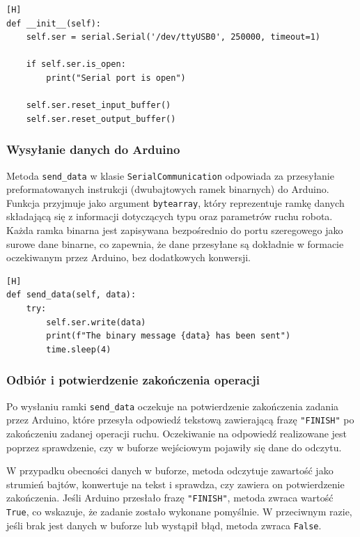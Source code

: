 \vspace*{0.5cm}


\begin{lstlisting}[caption=Kod inicjalizujący połączenie szeregowe, label=fig:serial_init, captionpos=b][H]
def __init__(self):
    self.ser = serial.Serial('/dev/ttyUSB0', 250000, timeout=1)

    if self.ser.is_open:
        print("Serial port is open")

    self.ser.reset_input_buffer()
    self.ser.reset_output_buffer()
\end{lstlisting}


\subsubsection*{Wysyłanie danych do Arduino}

Metoda \texttt{send\_data} w klasie \texttt{SerialCommunication} odpowiada za przesyłanie preformatowanych instrukcji (dwubajtowych ramek binarnych) do Arduino. Funkcja przyjmuje jako argument \texttt{bytearray}, który reprezentuje ramkę danych składającą się z informacji dotyczących typu oraz parametrów ruchu robota. Każda ramka binarna jest zapisywana bezpośrednio do portu szeregowego jako surowe dane binarne, co zapewnia, że dane przesyłane są dokładnie w formacie oczekiwanym przez Arduino, bez dodatkowych konwersji.

\vspace*{0.5cm}

\begin{lstlisting}[caption=Kod odpowiedzialny za wysyłanie danych do Arduino, label=fig:serial_send, captionpos=b][H]
def send_data(self, data):
    try:
        self.ser.write(data)  
        print(f"The binary message {data} has been sent")
        time.sleep(4) 
\end{lstlisting}


\subsubsection*{Odbiór i potwierdzenie zakończenia operacji}

Po wysłaniu ramki \texttt{send\_data} oczekuje na potwierdzenie zakończenia zadania przez Arduino, które przesyła odpowiedź tekstową zawierającą frazę \texttt{"FINISH"} po zakończeniu zadanej operacji ruchu. Oczekiwanie na odpowiedź realizowane jest poprzez sprawdzenie, czy w buforze wejściowym pojawiły się dane do odczytu.

W przypadku obecności danych w buforze, metoda odczytuje zawartość jako strumień bajtów, konwertuje na tekst i sprawdza, czy zawiera on potwierdzenie zakończenia. Jeśli Arduino przesłało frazę \texttt{"FINISH"}, metoda zwraca wartość \texttt{True}, co wskazuje, że zadanie zostało wykonane pomyślnie. W przeciwnym razie, jeśli brak jest danych w buforze lub wystąpił błąd, metoda zwraca \texttt{False}.

